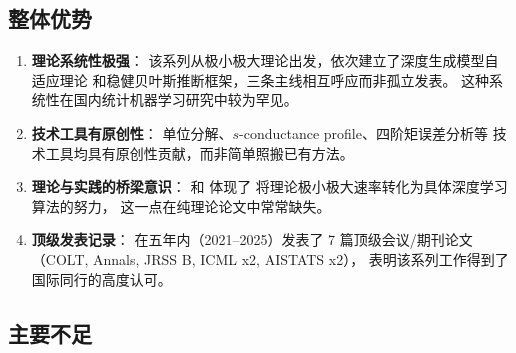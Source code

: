 \subsection{整体优势}\label{sec:strengths}

\begin{enumerate}
    \item \textbf{理论系统性极强}：
          该系列从极小极大理论出发，依次建立了深度生成模型自适应理论
          和稳健贝叶斯推断框架，三条主线相互呼应而非孤立发表。
          这种系统性在国内统计机器学习研究中较为罕见。

    \item \textbf{技术工具有原创性}：
          单位分解、$s$-conductance profile、四阶矩误差分析等
          技术工具均具有原创性贡献，而非简单照搬已有方法。

    \item \textbf{理论与实践的桥梁意识}：
          \citep{tang2023lowdim} 和 \citep{tang2024diffusion} 体现了
          将理论极小极大速率转化为具体深度学习算法的努力，
          这一点在纯理论论文中常常缺失。

    \item \textbf{顶级发表记录}：
          在五年内（2021--2025）发表了 7 篇顶级会议/期刊论文
          （COLT, Annals, JRSS B, ICML x2, AISTATS x2），
          表明该系列工作得到了国际同行的高度认可。
\end{enumerate}

\subsection{主要不足}\label{sec:weaknesses}

